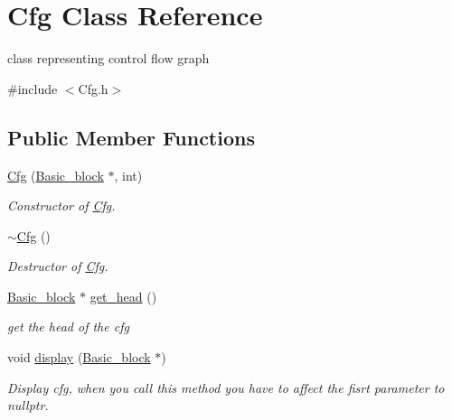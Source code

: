 \hypertarget{class_cfg}{}\section{Cfg Class Reference}
\label{class_cfg}


class representing control flow graph  




{\ttfamily \#include $<$Cfg.\+h$>$}

\subsection*{Public Member Functions}
\begin{DoxyCompactItemize}
\item 
\mbox{\label{class_cfg_a5b3fde5a67f0d8fdc9fbc0a18a304c1b}} 
\mbox{\hyperlink{class_cfg_a5b3fde5a67f0d8fdc9fbc0a18a304c1b}{Cfg}} (\mbox{\hyperlink{class_basic__block}{Basic\+\_\+block}} $\ast$, int)
\begin{DoxyCompactList}\small\item\em Constructor of \mbox{\hyperlink{class_cfg}{Cfg}}. \end{DoxyCompactList}\item 
\mbox{\label{class_cfg_a501719fee14ca23911e38939a7d668cd}} 
\mbox{\hyperlink{class_cfg_a501719fee14ca23911e38939a7d668cd}{$\sim$\+Cfg}} ()
\begin{DoxyCompactList}\small\item\em Destructor of \mbox{\hyperlink{class_cfg}{Cfg}}. \end{DoxyCompactList}\item 
\mbox{\label{class_cfg_a706e890e0cad8ae1a074fa1e11fe9c3a}} 
\mbox{\hyperlink{class_basic__block}{Basic\+\_\+block}} $\ast$ \mbox{\hyperlink{class_cfg_a706e890e0cad8ae1a074fa1e11fe9c3a}{get\+\_\+head}} ()
\begin{DoxyCompactList}\small\item\em get the head of the cfg \end{DoxyCompactList}\item 
\mbox{\label{class_cfg_aa68badf5580de78c9e669d7899803472}} 
void \mbox{\hyperlink{class_cfg_aa68badf5580de78c9e669d7899803472}{display}} (\mbox{\hyperlink{class_basic__block}{Basic\+\_\+block}} $\ast$)
\begin{DoxyCompactList}\small\item\em Display cfg, when you call this method you have to affect the fisrt parameter to nullptr. \end{DoxyCompactList}\item 

\end{DoxyCompactItemize}
